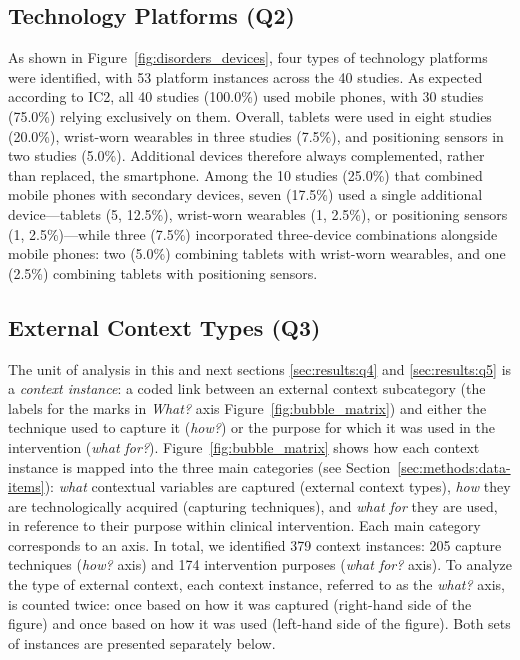 \subsection{Technology Platforms (Q2)}

As shown in Figure~\ref{fig:disorders_devices}, four types of technology platforms were identified, with 53 platform instances across the 40 studies. As expected according to IC2, all 40 studies (100.0\%) used mobile phones, with 30 studies (75.0\%) relying exclusively on them. Overall, tablets were used in eight studies (20.0\%), wrist-worn wearables in three studies (7.5\%), and positioning sensors in two studies (5.0\%). Additional devices therefore always complemented, rather than replaced, the smartphone. Among the 10 studies (25.0\%) that combined mobile phones with secondary devices, seven (17.5\%) used a single additional device—tablets (5, 12.5\%), wrist-worn wearables (1, 2.5\%), or positioning sensors (1, 2.5\%)—while three (7.5\%) incorporated three-device combinations alongside mobile phones: two (5.0\%) combining tablets with wrist-worn wearables, and one (2.5\%) combining tablets with positioning sensors.

\subsection{External Context Types (Q3)}
\label{sec:results:q3}


The unit of analysis in this and next sections \ref{sec:results:q4} and \ref{sec:results:q5} is a \emph{context instance}: a coded link between an external context subcategory (the labels for the marks in \textit{What?} axis Figure~\ref{fig:bubble_matrix}) and either the technique used to capture it (\textit{how?}) or the purpose for which it was used in the intervention (\textit{what for?}). Figure~\ref{fig:bubble_matrix} shows how each context instance is mapped into the three main categories (see Section~\ref{sec:methods:data-items}): \textit{what} contextual variables are captured (external context types), \textit{how} they are technologically acquired (capturing techniques), and \textit{what for} they are used, in reference to their purpose within clinical intervention. Each main category corresponds to an axis. In total, we identified 379 context instances: 205 capture techniques (\textit{how?} axis) and 174 intervention purposes (\textit{what for?} axis). To analyze the type of external context, each context instance, referred to as the \textit{what?} axis, is counted twice: once based on how it was captured (right-hand side of the figure) and once based on how it was used (left-hand side of the figure). Both sets of instances are presented separately below.

